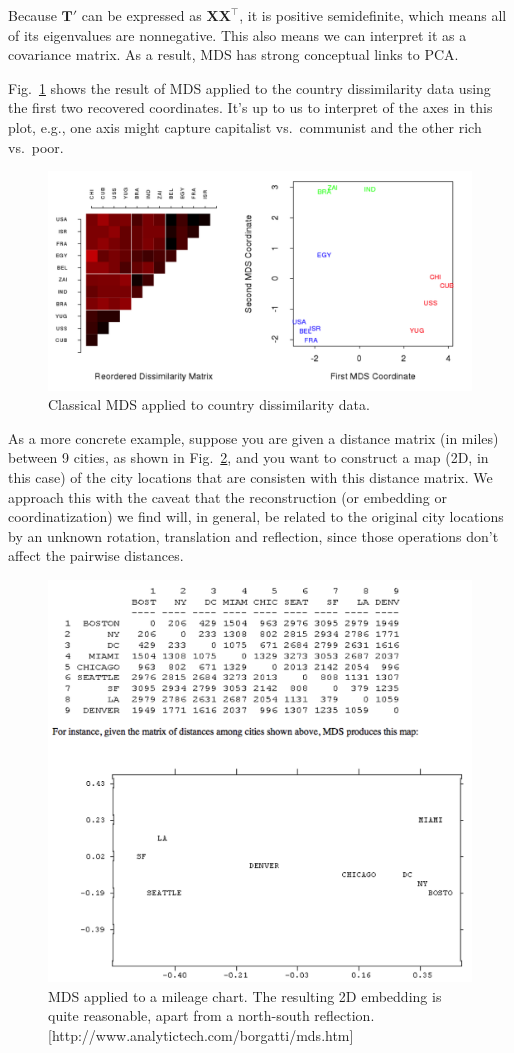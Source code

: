 \documentclass[a4paper]{article}
\begin{document}
Because $\mathbf{T}'$ can be expressed as $\mathbf{XX}^\top$, it is positive semidefinite, which means all of its eigenvalues are nonnegative.  This also means we can interpret it as a covariance matrix.  As a result, MDS has strong conceptual links to PCA. 

Fig.~\ref{fig:mds1} shows the result of MDS applied to the country dissimilarity data using the first two recovered coordinates.  It's up to us to interpret of the axes in this plot, e.g., one axis might capture capitalist vs.\ communist and the other rich vs.\ poor.

\begin{figure}
\centering
\includegraphics[width=1.0\textwidth]{mds.png}
\caption{\label{fig:mds1}Classical MDS applied to country dissimilarity data.}
\end{figure}

As a more concrete example, suppose you are given a distance matrix (in miles) between 9 cities, as shown in Fig.~\ref{fig:mds2}, and you want to construct a map (2D, in this case) of the city locations that are consisten with this distance matrix.  We approach this with the caveat that the reconstruction (or embedding or coordinatization) we find will, in general, be related to the original city locations by an unknown rotation, translation and reflection, since those operations don't affect the pairwise distances.

\begin{figure}
\centering
\includegraphics[width=1.0\textwidth]{mds2.png}
\caption{\label{fig:mds2}MDS applied to a mileage chart.  The resulting 2D embedding is quite reasonable, apart from a north-south reflection. [http://www.analytictech.com/borgatti/mds.htm]}
\end{figure}
\end{document}
